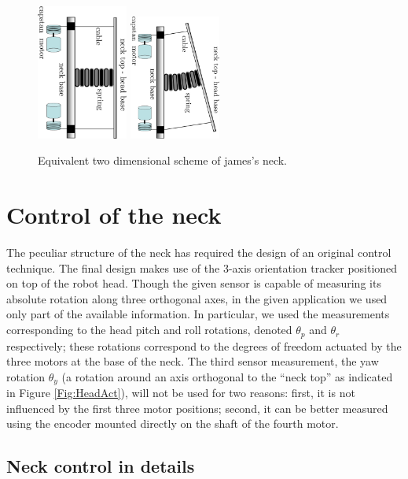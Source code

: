 \documentclass[conference]{IEEEtran}
\numberwithin{equation}{section}
\begin{document}
\begin{figure}[tbp]
\centering
\includegraphics[width=30mm, angle=90]{image/Neck2DSpringCompressed.pdf} 
\includegraphics[width=30mm, angle=90]{image/Neck2DSpringCompressedBent.pdf} 
\caption{Equivalent two dimensional scheme of james's neck.}
\label{Fig:HeadAct2DSpring}
\end{figure}


\section{Control of the neck} \label{Sec:NeckControl}

The peculiar structure of the neck has required the design of an original control technique. The final design makes use of the 3-axis orientation tracker positioned on top of the robot head. Though the given sensor is capable of measuring its absolute rotation along three orthogonal axes, in the given application we used only part of the available information. In particular, we used the measurements corresponding to the head pitch and roll rotations, denoted $\theta_p$ and $\theta_r$ respectively; these rotations correspond to the degrees of freedom actuated by the three motors at the base of the neck. The third sensor measurement, the yaw rotation $\theta_y$ (a rotation around an axis orthogonal to the ``neck top'' as indicated in Figure \ref{Fig:HeadAct}), will not be used for two reasons: first, it is not influenced by the first three motor positions; second, it can be better measured using the encoder mounted directly on the shaft of the fourth motor.

\subsection{Neck control in details} \label{Sec:NeckControlInDetails}
\end{document}
